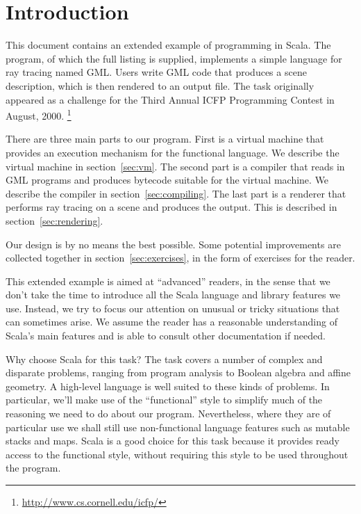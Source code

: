 \section{Introduction\label{sec:intro}}

This document contains an extended example of programming in Scala.
The program, of which the full listing is supplied,
implements a simple language for ray tracing named GML.
Users write GML code that produces a scene description,
which is then rendered to an output file.
The task originally appeared as a challenge for
the Third Annual ICFP Programming Contest in August, 2000.%
\footnote{\url{http://www.cs.cornell.edu/icfp/}}

There are three main parts to our program.
First is a virtual machine that provides
an execution mechanism for the functional language.
We describe the virtual machine in section~\ref{sec:vm}.
The second part is a compiler that reads in GML programs
and produces bytecode suitable for the virtual machine.
We describe the compiler in section~\ref{sec:compiling}.
The last part is a renderer that performs ray tracing on a scene
and produces the output.
This is described in section~\ref{sec:rendering}.

Our design is by no means the best possible.
Some potential improvements are collected together
in section~\ref{sec:exercises},
in the form of exercises for the reader.

This extended example is aimed at ``advanced'' readers,
in the sense that we don't take the time to introduce
all the Scala language and library features we use.
Instead, we try to focus our attention on unusual or tricky situations
that can sometimes arise.
We assume the reader has a reasonable understanding of Scala's main features
and is able to consult other documentation if needed.

Why choose Scala for this task?
The task covers a number of complex and disparate problems,
ranging from program analysis to Boolean algebra and affine geometry.
A high-level language is well suited to these kinds of problems.
In particular,
we'll make use of the ``functional'' style
to simplify much of the reasoning we need to do about our program.
Nevertheless, where they are of particular use
we shall still use non-functional language features
such as mutable stacks and maps.
Scala is a good choice for this task because
it provides ready access to the functional style,
without requiring this style to be used throughout the program.

